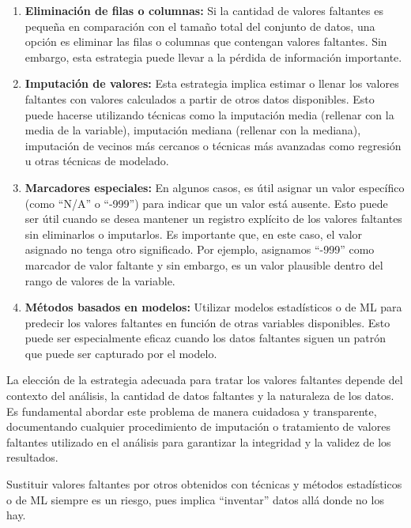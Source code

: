 \documentclass[
  letterpaper,
  DIV=11,
  numbers=noendperiod]{scrreprt}
\begin{document}
\begin{enumerate}
\def\labelenumi{\arabic{enumi}.}
\item
  \textbf{Eliminación de filas o columnas:} Si la cantidad de valores
  faltantes es pequeña en comparación con el tamaño total del conjunto
  de datos, una opción es eliminar las filas o columnas que contengan
  valores faltantes. Sin embargo, esta estrategia puede llevar a la
  pérdida de información importante.
\item
  \textbf{Imputación de valores:} Esta estrategia implica estimar o
  llenar los valores faltantes con valores calculados a partir de otros
  datos disponibles. Esto puede hacerse utilizando técnicas como la
  imputación media (rellenar con la media de la variable), imputación
  mediana (rellenar con la mediana), imputación de vecinos más cercanos
  o técnicas más avanzadas como regresión u otras técnicas de modelado.
\item
  \textbf{Marcadores especiales:} En algunos casos, es útil asignar un
  valor específico (como ``N/A'' o ``-999'') para indicar que un valor
  está ausente. Esto puede ser útil cuando se desea mantener un registro
  explícito de los valores faltantes sin eliminarlos o imputarlos. Es
  importante que, en este caso, el valor asignado no tenga otro
  significado. Por ejemplo, asignamos ``-999'' como marcador de valor
  faltante y sin embargo, es un valor plausible dentro del rango de
  valores de la variable.
\item
  \textbf{Métodos basados en modelos:} Utilizar modelos estadísticos o
  de ML para predecir los valores faltantes en función de otras
  variables disponibles. Esto puede ser especialmente eficaz cuando los
  datos faltantes siguen un patrón que puede ser capturado por el
  modelo.
\end{enumerate}

La elección de la estrategia adecuada para tratar los valores faltantes
depende del contexto del análisis, la cantidad de datos faltantes y la
naturaleza de los datos. Es fundamental abordar este problema de manera
cuidadosa y transparente, documentando cualquier procedimiento de
imputación o tratamiento de valores faltantes utilizado en el análisis
para garantizar la integridad y la validez de los resultados.

\begin{tcolorbox}[enhanced jigsaw, arc=.35mm, breakable, coltitle=black, left=2mm, opacityback=0, bottomtitle=1mm, colbacktitle=quarto-callout-warning-color!10!white, title=\textcolor{quarto-callout-warning-color}{\faExclamationTriangle}\hspace{0.5em}{Peligro}, titlerule=0mm, colback=white, colframe=quarto-callout-warning-color-frame, bottomrule=.15mm, rightrule=.15mm, opacitybacktitle=0.6, toptitle=1mm, toprule=.15mm, leftrule=.75mm]

Sustituir valores faltantes por otros obtenidos con técnicas y métodos
estadísticos o de ML siempre es un riesgo, pues implica ``inventar''
datos allá donde no los hay.

\end{tcolorbox}
\end{document}
